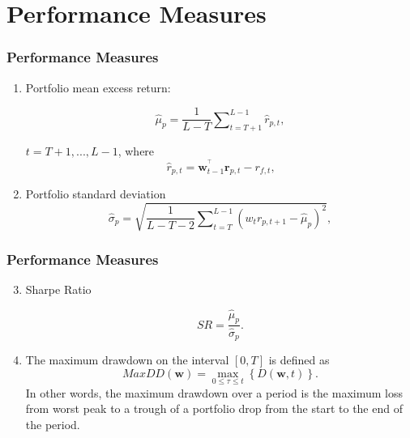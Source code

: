 \documentclass[pdf,10pt,xcolor=dvipsnames,hide notes]{beamer}
\begin{document}
\section{Performance Measures}

\begin{frame}
\frametitle{Performance Measures}

	\begin{enumerate}
	\setcounter{enumi}{0}

\item Portfolio mean excess return:

\begin{equation}
\widehat{\mu }_{p}=\frac{1}{L-T}\sum\nolimits_{t=T+1}^{L-1}\widehat{r}_{p,t},
\end{equation}

$t=T+1,...,L-1$, where 
\begin{equation}
\widehat{r}_{p,t}=\mathbf{w}_{t-1}^{^{\top }}\mathbf{r}_{p,t}-r_{f,t}\text{,}
\end{equation}%

\vspace{0.3cm}

\item Portfolio standard deviation 
\begin{equation}
\widehat{\sigma }_{p}=\sqrt{\frac{1}{L-T-2}\sum\nolimits_{t=T}^{L-1}\left(
	w_{t}r_{p,t+1}-\widehat{\mu }_{p}\right) ^{2}},
\end{equation}%

\end{enumerate}

\end{frame}

\begin{frame}
	\frametitle{Performance Measures}
	
	\begin{enumerate}
		\setcounter{enumi}{2}
		
		\item Sharpe Ratio
		
		\begin{equation}
		SR=\frac{\widehat{\mu }_{p}}{\widehat{\sigma }_{p}}.
		\end{equation}
		
		\vspace{0.3cm}
		
			\item The maximum drawdown on the interval $[0,T]$ is defined as
		\begin{equation}
		MaxDD\left( \mathbf{w}\right) =\underset{0\leq \tau \leq t}{\max }\left\{
		D\left( \mathbf{w,}t\right) \right\} .
		\end{equation}
		In other words, the maximum drawdown over a period is the maximum loss from
		worst peak to a trough of a portfolio drop from the start to the end of the
		period.
		
		
	\end{enumerate}

\end{frame}
\end{document}
